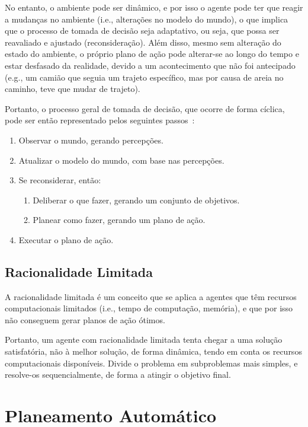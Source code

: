 No entanto, o ambiente pode ser dinâmico, e por isso o agente pode ter que reagir a mudanças no ambiente (i.e., alterações no modelo do mundo), o que implica que o processo de tomada de decisão seja adaptativo, ou seja, que possa ser reavaliado e ajustado (reconsideração).
Além disso, mesmo sem alteração do estado do ambiente, o próprio plano de ação pode alterar-se ao longo do tempo e estar desfasado da realidade, devido a um acontecimento que não foi antecipado (e.g., um camião que seguia um trajeto específico, mas por causa de areia no caminho, teve que mudar de trajeto).

Portanto, o processo geral de tomada de decisão, que ocorre de forma cíclica, pode ser então representado pelos seguintes passos~\cite{isel:iasa:slides:arq-agentes-deliberativos}:

\begin{enumerate}
    \item Observar o mundo, gerando percepções.
    \item Atualizar o modelo do mundo, com base nas percepções.
    \item Se reconsiderar, então:
    \begin{enumerate}
        \item Deliberar o que fazer, gerando um conjunto de objetivos.
        \item Planear como fazer, gerando um plano de ação.
    \end{enumerate}
    \item Executar o plano de ação.
\end{enumerate}

\subsection{Racionalidade Limitada}\label{subsec:racionalidade-limitada}

A racionalidade limitada é um conceito que se aplica a agentes que têm recursos computacionais limitados (i.e., tempo de computação, memória), e que por isso não conseguem gerar planos de ação ótimos.

Portanto, um agente com racionalidade limitada tenta chegar a uma solução satisfatória, não à melhor solução, de forma dinâmica, tendo em conta os recursos computacionais disponíveis.
Divide o problema em subproblemas mais simples, e resolve-os sequencialmente, de forma a atingir o objetivo final.


\section{Planeamento Automático}\label{sec:planeamento-automatico}

